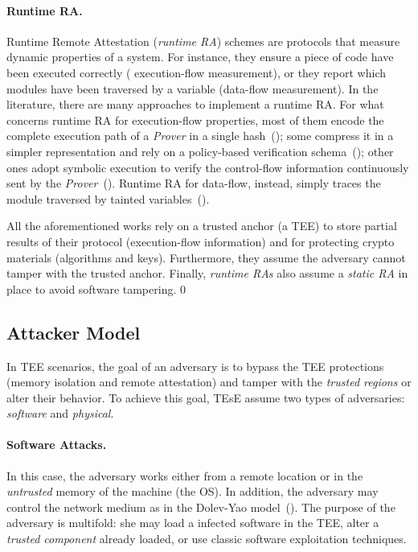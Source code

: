 \paragraph{Runtime RA.}


Runtime Remote Attestation (\emph{runtime RA}) schemes are protocols that 
measure dynamic properties of a system.
For instance, they ensure a piece of code have been executed correctly (\ie 
execution-flow measurement), or they report which modules have been traversed 
by a variable (\ie data-flow measurement).
In the literature, there are many approaches to implement a runtime RA.
For what concerns runtime RA for execution-flow properties, most of them encode 
the complete execution path of a \emph{Prover} in a single 
hash~(\cite{abera2016c,zeitouni2017atrium,dessouky2017fat}); 
some compress it in a simpler representation and rely on a 
policy-based verification schema~(\cite{aberadiat}); 
other ones adopt symbolic execution to verify the control-flow information 
continuously sent by the 
\emph{Prover}~(\cite{Dessouky:2018:LLH:3240765.3240821}).
Runtime RA for data-flow, instead, simply traces the module traversed by 
tainted variables~(\cite{apex,aberadiat}).

All the aforementioned works rely on a trusted anchor (\eg a TEE) to store 
partial results of their protocol (\eg execution-flow information) and for 
protecting crypto materials (\ie algorithms and keys).
Furthermore, they assume the adversary cannot tamper with the trusted anchor.
Finally, \emph{runtime RAs} also assume a \emph{static RA} in place to avoid 
software tampering.
0
\subsection{Attacker Model}
\label{ssec:attacker-model}

In TEE scenarios, the goal of an adversary is to bypass the TEE protections 
(\ie memory isolation and remote attestation) and tamper with the \emph{trusted 
regions} or alter their behavior.
To achieve this goal, TEsE assume two types of adversaries: \emph{software} and 
\emph{physical}.

\paragraph{Software Attacks.} 
In this case, the adversary works either from a remote location or in the 
\emph{untrusted} memory of the machine (\eg the OS).
In addition, the adversary may control the network medium as in the Dolev-Yao 
model~(\cite{dolev}).
The purpose of the adversary is multifold: she may load a infected software in 
the TEE, alter a \emph{trusted component} already loaded, or use classic 
software exploitation techniques.

